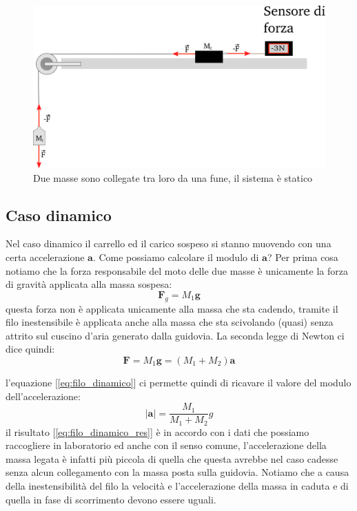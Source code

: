 \documentclass[a4paper,10pt,oneside]{article}
\begin{document}
\begin{figure}[H]
 \centering
 \includegraphics[width=\textwidth]{./Immagini/masse_filo_statico.png}
 \caption{Due masse sono collegate tra loro da una fune, il sistema è statico}
 \label{fig:filo_statico}
\end{figure}

\subsection*{Caso dinamico}

Nel caso dinamico il carrello ed il carico sospeso si stanno muovendo con una certa accelerazione $\mathbf{a}$. Come possiamo calcolare il modulo di $\mathbf{a}$?
Per prima cosa notiamo che la forza responsabile del moto delle due masse è unicamente la forza di gravità applicata alla massa sospesa:
\begin{equation}
 \mathbf{F}_g=M_1\mathbf{g}
\end{equation}
questa forza non è applicata unicamente alla massa che sta cadendo, tramite il filo inestensibile è applicata anche alla massa che sta scivolando (quasi) senza attrito sul cuscino d'aria generato dalla guidovia. La seconda legge di Newton ci dice quindi:
\begin{equation}\label{eq:filo_dinamico}
 \mathbf{F}=M_1\mathbf{g}=(M_1+M_2)\mathbf{a}
\end{equation}

l'equazione [\ref{eq:filo_dinamico}] ci permette quindi di ricavare il valore del modulo dell'accelerazione:
\begin{equation}\label{eq:filo_dinamico_res}
 |\mathbf{a}|=\frac{M_1}{M_1+M_2}g
\end{equation}
il risultato [\ref{eq:filo_dinamico_res}] è in accordo con i dati che possiamo raccogliere in laboratorio ed anche con il senso comune, l'accelerazione della massa legata è infatti più piccola di quella che questa avrebbe nel caso cadesse senza alcun collegamento con la massa posta sulla guidovia. Notiamo che a causa della inestensibilità del filo la velocità e l'accelerazione della massa in caduta e di quella in fase di scorrimento devono essere uguali.
\end{document}
